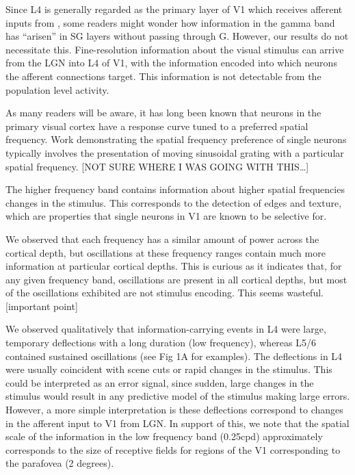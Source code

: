 Since \ac{L4} is generally regarded as the primary layer of \ac{V1} which receives afferent inputs from , some readers might wonder how information in the gamma band has ``arisen'' in \ac{SG} layers without passing through \ac{G}.
However, our results do not necessitate this.
Fine-resolution information about the visual stimulus can arrive from the \ac{LGN} into \ac{L4} of \ac{V1}, with the information encoded into which neurons the afferent connections target.
This information is not detectable from the population level activity.


As many readers will be aware, it has long been known that neurons in the primary visual cortex have a response curve tuned to a preferred spatial frequency.
Work demonstrating the spatial frequency preference of single neurons typically involves the presentation of moving sinusoidal grating with a particular spatial frequency.
[NOT SURE WHERE I WAS GOING WITH THIS{\dots}]

The higher frequency band contains information about higher spatial frequencies changes in the stimulus.
This corresponds to the detection of edges and texture, which are properties that single neurons in \ac{V1} are known to be selective for.


We observed that each frequency has a similar amount of power across the cortical depth, but oscillations at these frequency ranges contain much more information at particular cortical depths.
This is curious as it indicates that, for any given frequency band, oscillations are present in all cortical depths, but most of the oscillations exhibited are not stimulus encoding.
This seems wasteful.
[important point]

We observed qualitatively that information-carrying events in \ac{L4} were large, temporary deflections with a long duration (low frequency), whereas \acs{L5}/6 contained sustained oscillations (see Fig 1A for examples).
The deflections in \ac{L4} were usually coincident with scene cuts or rapid changes in the stimulus.
This could be interpreted as an error signal, since sudden, large changes in the stimulus would result in any predictive model of the stimulus making large errors.
However, a more simple interpretation is these deflections correspond to changes in the afferent input to \ac{V1} from \ac{LGN}.
In support of this, we note that the spatial scale of the information in the low frequency band (0.25cpd) approximately corresponds to the size of receptive fields for regions of the \ac{V1} corresponding to the parafovea (2 degrees).

